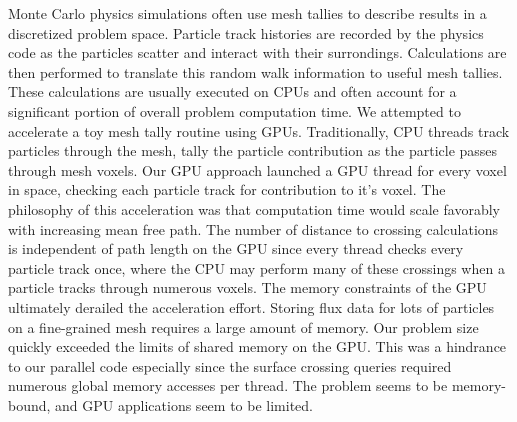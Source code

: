 \abstract
Monte Carlo physics simulations often use mesh tallies to describe results in a
discretized problem space. Particle track histories are recorded by the physics
code as the particles scatter and interact with their surrondings. Calculations
are then performed to translate this random walk information to useful mesh
tallies. These calculations are usually executed on CPUs and often account for a
significant portion of overall problem computation time. We attempted to
accelerate a toy mesh tally routine using GPUs. Traditionally, CPU threads track
particles through the mesh, tally the particle contribution as the particle
passes through mesh voxels. Our GPU approach launched a GPU thread for every
voxel in space, checking each particle track for contribution to it's voxel.
The philosophy of this acceleration was that computation time would scale
favorably with increasing mean free path. The number of distance to crossing
calculations is independent of path length on the GPU since every thread checks
every particle track once, where the CPU may perform many of these crossings
when a particle tracks through numerous voxels. The memory constraints of the
GPU ultimately derailed the acceleration effort. Storing flux data for lots of
particles on a fine-grained mesh requires a large amount of memory. Our problem
size quickly exceeded the limits of shared memory on the GPU. This was a
hindrance to our parallel code especially since the surface crossing queries
required numerous global memory accesses per thread. The problem seems to be
memory-bound, and GPU applications seem to be limited.

